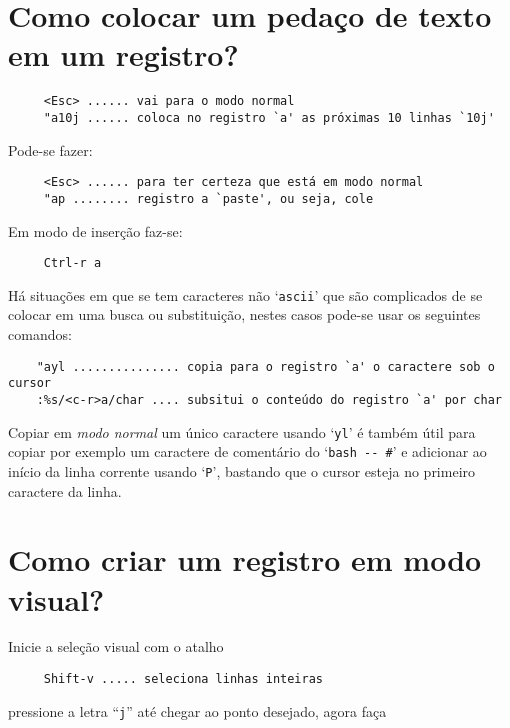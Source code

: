 \section{Como colocar um pedaço de texto em um registro?}
\label{Como colocar um pedaço de texto em um registro?}

\begin{verbatim}
     <Esc> ...... vai para o modo normal
     "a10j ...... coloca no registro `a' as próximas 10 linhas `10j'
\end{verbatim}

Pode-se fazer:

\begin{verbatim}
     <Esc> ...... para ter certeza que está em modo normal
     "ap ........ registro a `paste', ou seja, cole
\end{verbatim}

Em modo de inserção faz-se:

\begin{verbatim}
     Ctrl-r a
\end{verbatim}

{\Large {}} Há situações em que se tem caracteres não `{\tt ascii}' que
são complicados de se colocar em uma busca ou substituição, nestes casos
pode-se usar os seguintes comandos:

\begin{verbatim}
    "ayl ............... copia para o registro `a' o caractere sob o cursor
    :%s/<c-r>a/char .... subsitui o conteúdo do registro `a' por char
\end{verbatim}

Copiar em {\em modo normal} um único caractere usando `{\tt yl}' é também útil
para copiar por exemplo um caractere de comentário do `\verb+bash -- #+' e 
adicionar ao início da linha corrente usando `{\tt P}', bastando que o cursor
esteja no primeiro caractere da linha.

\section{Como criar um registro em modo visual?}
\label{Como criar um registro em modo visual?}
Inicie a seleção visual com o atalho

\begin{verbatim}
     Shift-v ..... seleciona linhas inteiras
\end{verbatim}

pressione a letra ``\verb|j|'' até chegar ao ponto desejado, agora faça

